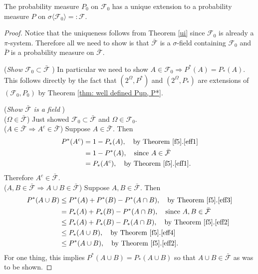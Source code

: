 \begin{theorem}
\label{thm: Caratheodory}
The probability measure $P_0$ on $\mathcal F_0$ has a unique extension to a probability measure $P$ on $\sigma\langle \mathcal F_0\rangle=:\mathcal F$.
\end{theorem}
\begin{proof}
Notice that the uniqueness follows from Theorem \ref{ui} since $\mathcal F_0$ is already a $\pi$-system. Therefore all we need to show is that $\bar{\mathcal F}$ is a $\sigma$-field containing $\mathcal F_0$ and $\bar P$ is a probability measure on $\bar{\mathcal F}$.

({\sl Show $\mathcal F_0\subset \bar{\mathcal F}$ }) In particular we need to show  $A\in \mathcal F_0\Longrightarrow P^*(A) = P_*(A)$. This follows directly by the fact that $(2^\Omega,P^*)$ and $(2^\Omega,P_*)$ are extensions of $(\mathcal F_0, P_0)$ by Theorem  \ref{thm: well defined Pup, P*}.

({\sl Show $\bar{\mathcal F}$ is a field })\\
\textbullet($\Omega\in \bar{\mathcal F}$) Just showed $\mathcal F_0\subset \bar{\mathcal F}$ and  $\Omega\in \mathcal F_0$.
\\
\textbullet($A\in \bar{\mathcal F}\Longrightarrow A^c \in \bar{\mathcal F}$)
Suppose $A\in \bar{\mathcal F}$. Then
\begin{align}
P^*(A^c) &= 1 - P_*(A),\quad\text{by Theorem \ref{f5}.\ref{eff1}} \nonumber\\
	&=1 - P^*(A),\quad\text{since $A\in \bar{\mathcal F}$} \nonumber\\
	&=P_*(A^c),\quad\text{by Theorem \ref{f5}.\ref{eff1}}. \label{eq: comp for P*}
\end{align}
Therefore  $A^c\in \bar{\mathcal F}$.
\\
\textbullet($A, B\in \bar{\mathcal F}\Longrightarrow A\cup B \in \bar{\mathcal F}$)
Suppose $A, B\in \bar{\mathcal F}$. Then
\begin{align}
P^*(A\cup B) &\leq P^*(A)+P^*(B)-P^*(A\cap B)  ,\quad\text{by Theorem \ref{f5}.\ref{eff3}} \nonumber\\
	&=P_*(A)+P_*(B)-P^*(A\cap B) ,\quad\text{since $A,B\in \bar{\mathcal F}$} \nonumber\\
	&\leq P_*(A)+P_*(B)-P_*(A\cap B) ,\quad\text{by Theorem \ref{f5}.\ref{eff2}} \nonumber\\
	&\leq P_*(A\cup B),\quad\text{by Theorem \ref{f5}.\ref{eff4}}\nonumber\\
	&\leq P^*(A\cup B),\quad\text{by Theorem \ref{f5}.\ref{eff2}}. \label{eq: inc-ex for P*}
\end{align}
For one thing, this implies $P^*(A\cup B) = P_*(A\cup B)$ so that $A\cup B\in \bar{\mathcal F}$ as was to be shown.




\end{proof}
